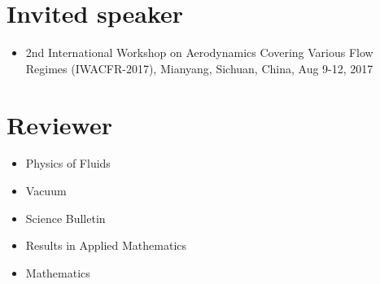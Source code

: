 \documentclass[11pt,a4paper,english]{moderncv}
\begin{document}
\section{Invited speaker}
\begin{itemize}
    \item 2nd International Workshop on Aerodynamics Covering Various Flow Regimes (IWACFR-2017),
        Mianyang, Sichuan, China, Aug 9-12, 2017
\end{itemize}

\section{Reviewer}
\begin{itemize}
    \item Physics of Fluids
    \item Vacuum
    \item Science Bulletin
    \item Results in Applied Mathematics
    \item Mathematics
\end{itemize}

\nocite{*}
\printbibliography[title=Main Publications, keyword=primary, resetnumbers=true]
\printbibliography[title=Other Publications, keyword=secondary, resetnumbers=true]
\end{document}
